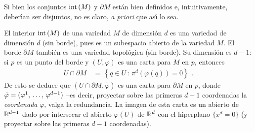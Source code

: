 Si bien los conjuntos $\mathrm{int}\left(M\right)$ y $\partial M$ est\'{a}n bien definidos
e, intuitivamente, deber\'{\i}an ser disjuntos, no es claro, \textit{a %
priori} que as\'{\i} lo sea.


El interior $\mathrm{int}\left(M\right)$ de una variedad $M$ de dimensi\'{o}n $d$ es una
variedad de dimensi\'{o}n $d$ (sin borde), pues es un subespacio
abierto de la variedad $M$. El borde $\partial M$ tambi\'{e}n es una
variedad topol\'{o}gica (sin borde). Su dimensi\'{o}n es $d-1$: si $p$
es un punto del borde y $(U,\varphi)$ es una carta para $M$ en $p$,
entonces
\begin{align*}
	U\cap\partial M & \,=\,\left\lbrace q\in U\,:\,\pi^{d}(\varphi(q))=0
				\right\rbrace
	\text{ .}
\end{align*}
%
De esto se deduce que $(U\cap\partial M,\tilde{\varphi})$ es una carta para
$\partial M$ en $p$, donde $\tilde{\varphi}=(\lista*{\varphi}{d-1})$ --es
decir, proyectar sobre las primeras $d-1$ coordenadas la \emph{coordenada}
$\varphi$, valga la redundancia. La imagen de esta carta es un abierto de
$\mathbb{R}^{d-1}$ dado por intersecar el abierto $\varphi(U)$ de $\mathbb{R}^{d}$
con el hiperplano $\{x^{d}=0\}$ (y proyectar sobre las primeras $d-1$
coordenadas).

